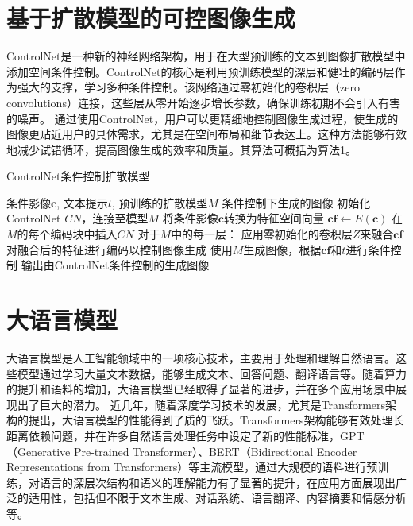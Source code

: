 \documentclass[a4paper,AutoFakeBold,oneside,12pt]{book}
\begin{document}
\section{基于扩散模型的可控图像生成}
ControlNet\cite{zhang2023adding}是一种新的神经网络架构，用于在大型预训练的文本到图像扩散模型中添加空间条件控制。ControlNet的核心是利用预训练模型的深层和健壮的编码层作为强大的支撑，学习多种条件控制。该网络通过零初始化的卷积层（zero convolutions）连接，这些层从零开始逐步增长参数，确保训练初期不会引入有害的噪声。
通过使用ControlNet，用户可以更精细地控制图像生成过程，使生成的图像更贴近用户的具体需求，尤其是在空间布局和细节表达上。这种方法能够有效地减少试错循环，提高图像生成的效率和质量。其算法可概括为算法1。
\begin{algorithm}
	\begin{spacing}{1.3}
		\caption{ControlNet条件控制扩散模型} 
		\label{alg:controlnet}
		\renewcommand{\algorithmicrequire}{\textbf{输入：}}
		\renewcommand{\algorithmicensure}{\textbf{输出：}} 
		\begin{algorithmic}[1] 
			\Require 条件影像$\bm{c}$, 文本提示$t$, 预训练的扩散模型$M$
			\Ensure 条件控制下生成的图像
			\State 初始化ControlNet $CN$，连接至模型$M$
			\State 将条件影像$\bm{c}$转换为特征空间向量 $\bm{cf} \gets E(\bm{c})$
			\State 在$M$的每个编码块中插入$CN$
			\State 对于$M$中的每一层：
			\State \hspace{\algorithmicindent} 应用零初始化的卷积层$Z$来融合$\bm{cf}$
			\State \hspace{\algorithmicindent} 对融合后的特征进行编码以控制图像生成
			\State 使用$M$生成图像，根据$\bm{cf}$和$t$进行条件控制
			\State 输出由ControlNet条件控制的生成图像
		\end{algorithmic}
	\end{spacing}
\end{algorithm}

\section{大语言模型}
大语言模型是人工智能领域中的一项核心技术，主要用于处理和理解自然语言。这些模型通过学习大量文本数据，能够生成文本、回答问题、翻译语言等。随着算力的提升和语料的增加，大语言模型已经取得了显著的进步，并在多个应用场景中展现出了巨大的潜力。
近几年，随着深度学习技术的发展，尤其是Transformers架构的提出，大语言模型的性能得到了质的飞跃。Transformers架构能够有效处理长距离依赖问题，并在许多自然语言处理任务中设定了新的性能标准，GPT（Generative Pre-trained Transformer）、BERT（Bidirectional Encoder Representations from Transformers）等主流模型，通过大规模的语料进行预训练，对语言的深层次结构和语义的理解能力有了显著的提升，在应用方面展现出广泛的适用性，包括但不限于文本生成、对话系统、语言翻译、内容摘要和情感分析等。
\end{document}
